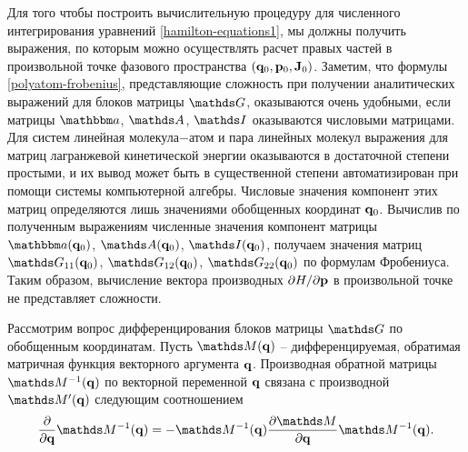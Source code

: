 Для того чтобы построить вычислительную процедуру для численного интегрирования уравнений \eqref{hamilton-equations1}, мы должны получить выражения, по которым можно осуществлять расчет правых частей в произвольной точке фазового пространства $\left( \mathbf{q}_0, \mathbf{p}_0, \mathbf{J}_0 \right)$. Заметим, что формулы \eqref{polyatom-frobenius}, представляющие сложность при получении аналитических выражений для блоков матрицы $\bbG$, оказываются очень удобными, если матрицы $\bba$, $\bbA$, $\bbI$ оказываются числовыми матрицами. Для систем линейная молекула$-$атом и пара линейных молекул выражения для матриц лагранжевой кинетической энергии оказываются в достаточной степени простыми, и их вывод может быть в существенной степени автоматизирован при помощи системы компьютерной алгебры. Числовые значения компонент этих матриц определяются лишь значениями обобщенных координат $\mathbf{q}_0$. Вычислив по полученным выражениям численные значения компонент матрицы $\bba(\mf{q}_0)$, $\bbA(\mf{q}_0)$, $\bbI(\mf{q}_0)$, получаем значения матриц $\bbG_{11}(\mf{q}_0)$, $\bbG_{12}(\mf{q}_0)$, $\bbG_{22}(\mf{q}_0)$ по формулам Фробениуса. Таким образом, вычисление вектора производных $\partial H / \partial \mathbf{p}$ в произвольной точке не представляет сложности. \par
Рассмотрим вопрос дифференцирования блоков матрицы $\bbG$ по обобщенным координатам. Пусть $\bbM(\mf{q})$ -- дифференцируемая, обратимая матричная функция векторного аргумента $\mathbf{q}$. Производная обратной матрицы $\bbM^{-1}(\mf{q})$ по векторной переменной $\mathbf{q}$ связана с производной $\bbM^\prime(\mf{q})$ следующим соотношением \cite{matrixcookbook}
\begin{gather}
    \frac{\partial}{\partial \mf{q}} \bbM^{-1}(\mf{q}) = - \bbM^{-1}(\mf{q}) \frac{\partial \bbM}{\partial \mf{q}} \bbM^{-1}(\mf{q}).
\end{gather}


